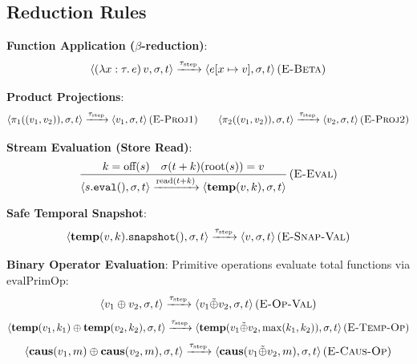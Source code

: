 \documentclass[11pt,a4paper]{article}
\theoremstyle{definition}
\theoremstyle{plain}
\newcommand{\ty}[1]{\texttt{#1}}
\newcommand{\step}[1]{\xrightarrow{#1}}
\begin{document}
\subsection{Reduction Rules}

\textbf{Function Application ($\beta$-reduction)}:
\begin{equation}
\langle (\lambda x:\tau.\, e)\, v, \sigma, t \rangle \step{\tau_{\text{step}}} \langle e[x \mapsto v], \sigma, t \rangle \, (\textsc{E-Beta})
\end{equation}

\textbf{Product Projections}:
\begin{equation}
\langle \pi_1((v_1, v_2)), \sigma, t \rangle \step{\tau_{\text{step}}} \langle v_1, \sigma, t \rangle \, (\textsc{E-Proj1}) \qquad
\langle \pi_2((v_1, v_2)), \sigma, t \rangle \step{\tau_{\text{step}}} \langle v_2, \sigma, t \rangle \, (\textsc{E-Proj2})
\end{equation}

\textbf{Stream Evaluation (Store Read)}:
\begin{equation}
\frac{k = \text{off}(s) \quad \sigma(t + k)(\text{root}(s)) = v}{\langle s.\ty{eval}(), \sigma, t \rangle \step{\text{read}(t + k)} \langle \mathbf{temp}(v, k), \sigma, t \rangle} \, (\textsc{E-Eval})
\end{equation}

\textbf{Safe Temporal Snapshot}:
\begin{equation}
\langle \mathbf{temp}(v, k).\ty{snapshot}(), \sigma, t \rangle \step{\tau_{\text{step}}} \langle v, \sigma, t \rangle \, (\textsc{E-Snap-Val})
\end{equation}

\textbf{Binary Operator Evaluation}:
Primitive operations evaluate total functions via $\text{evalPrimOp}$:
\begin{equation}
\langle v_1 \oplus v_2, \sigma, t \rangle \step{\tau_{\text{step}}} \langle v_1 \tilde{\oplus} v_2, \sigma, t \rangle \, (\textsc{E-Op-Val})
\end{equation}
\begin{equation}
\langle \mathbf{temp}(v_1, k_1) \oplus \mathbf{temp}(v_2, k_2), \sigma, t \rangle \step{\tau_{\text{step}}} \langle \mathbf{temp}(v_1 \tilde{\oplus} v_2, \max(k_1, k_2)), \sigma, t \rangle \, (\textsc{E-Temp-Op})
\end{equation}
\begin{equation}
\langle \mathbf{caus}(v_1, m) \oplus \mathbf{caus}(v_2, m), \sigma, t \rangle \step{\tau_{\text{step}}} \langle \mathbf{caus}(v_1 \tilde{\oplus} v_2, m), \sigma, t \rangle \, (\textsc{E-Caus-Op})
\end{equation}
\end{document}
